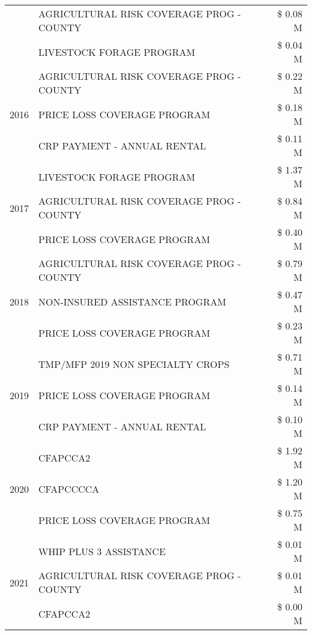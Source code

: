 \begin{tabular}{llr}
 & AGRICULTURAL RISK COVERAGE PROG - COUNTY & \$ 0.08 M \\
 & LIVESTOCK FORAGE PROGRAM & \$ 0.04 M \\
\cline{1-3}
\multirow[t]{3}{*}{2016} & AGRICULTURAL RISK COVERAGE PROG - COUNTY & \$ 0.22 M \\
 & PRICE LOSS COVERAGE PROGRAM & \$ 0.18 M \\
 & CRP PAYMENT - ANNUAL RENTAL & \$ 0.11 M \\
\cline{1-3}
\multirow[t]{3}{*}{2017} & LIVESTOCK FORAGE PROGRAM & \$ 1.37 M \\
 & AGRICULTURAL RISK COVERAGE PROG - COUNTY & \$ 0.84 M \\
 & PRICE LOSS COVERAGE PROGRAM & \$ 0.40 M \\
\cline{1-3}
\multirow[t]{3}{*}{2018} & AGRICULTURAL RISK COVERAGE PROG - COUNTY & \$ 0.79 M \\
 & NON-INSURED ASSISTANCE PROGRAM & \$ 0.47 M \\
 & PRICE LOSS COVERAGE PROGRAM & \$ 0.23 M \\
\cline{1-3}
\multirow[t]{3}{*}{2019} & TMP/MFP 2019 NON SPECIALTY CROPS & \$ 0.71 M \\
 & PRICE LOSS COVERAGE PROGRAM & \$ 0.14 M \\
 & CRP PAYMENT - ANNUAL RENTAL & \$ 0.10 M \\
\cline{1-3}
\multirow[t]{3}{*}{2020} & CFAPCCA2 & \$ 1.92 M \\
 & CFAPCCCCA & \$ 1.20 M \\
 & PRICE LOSS COVERAGE PROGRAM & \$ 0.75 M \\
\cline{1-3}
\multirow[t]{3}{*}{2021} & WHIP PLUS 3 ASSISTANCE & \$ 0.01 M \\
 & AGRICULTURAL RISK COVERAGE PROG - COUNTY & \$ 0.01 M \\
 & CFAPCCA2 & \$ 0.00 M \\
\cline{1-3}
\bottomrule
\end{tabular}
